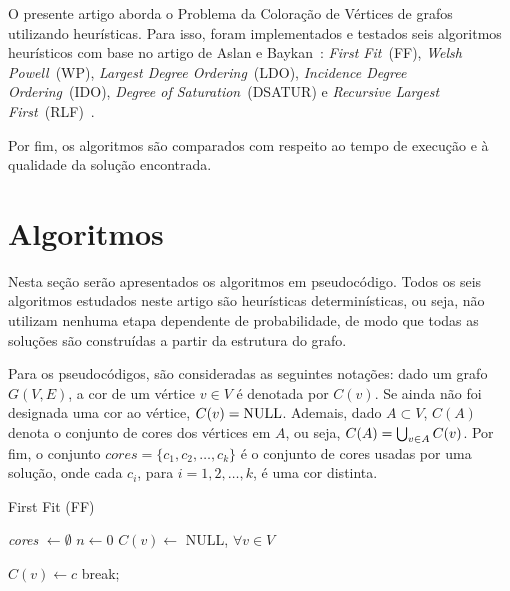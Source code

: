 \documentclass[10pt, twocolumn]{article}
\begin{document}
O presente artigo aborda o Problema da Coloração de Vértices de grafos utilizando
heurísticas.
Para isso, foram implementados e testados seis algoritmos heurísticos com base no artigo de
Aslan e Baykan~\cite{AsBa18}: \emph{First Fit}~(FF), \emph{Welsh Powell}~(WP),
\emph{Largest Degree Ordering}~(LDO), \emph{Incidence Degree Ordering}~(IDO),
\emph{Degree of Saturation}~(DSATUR) e \emph{Recursive Largest First}~(RLF)~\cite{AsBa18}.

Por fim, os algoritmos são comparados com respeito ao tempo de execução e à
qualidade da solução encontrada.


\section{Algoritmos}

Nesta seção serão apresentados os algoritmos em pseudocódigo.
Todos os seis algoritmos estudados neste artigo são heurísticas determinísticas,
ou seja, não utilizam nenhuma etapa dependente de probabilidade, de modo que
todas as soluções são construídas a partir da estrutura do grafo.

Para os pseudocódigos, são consideradas as seguintes notações:
dado um grafo $G(V,E)$, a cor de um vértice $v \in V$ é denotada por $C(v)$.
Se ainda não foi designada uma cor ao vértice, $C(v) = \textnormal{NULL}$.
Ademais, dado $A \subset V$, $C(A)$ denota o conjunto de cores dos vértices em $A$,
ou seja, $C(A)\nobreak=\nobreak\bigcup_{v \in A} C(v)$. Por fim, o conjunto
$cores = \{c_1, c_2, \dots, c_k\}$ é o conjunto de cores usadas por uma solução,
onde cada $c_i$, para $i = 1, 2, \dots, k$, é uma cor distinta.



\begin{algorithm}
\caption{First Fit (FF)}
\label{alg:ff}


\emph{cores} $\gets \emptyset$\;
$n \gets 0$\;
$C(v) \gets$ NULL, $\forall v \in V$\;

 {
     {
         {
            $C(v) \gets c$\;
            break;
        }
    }
}
\;

\end{algorithm}
\end{document}
